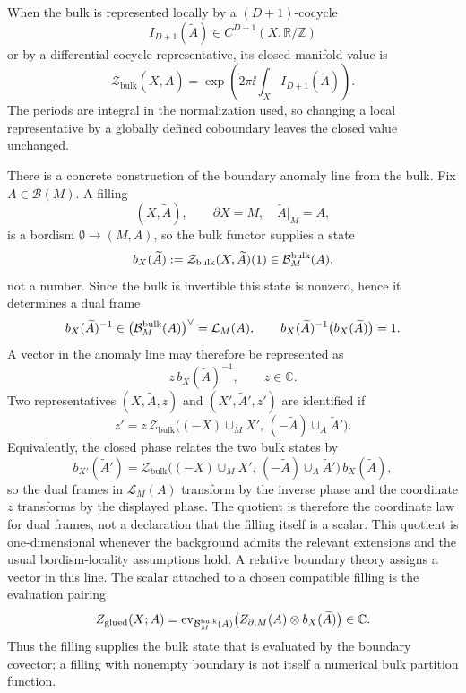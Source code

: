 When the bulk is represented locally by a \((D+1)\)-cocycle
\[
  I_{D+1}(\widetilde A)\in C^{D+1}(X,\mathbb R/\mathbb Z)
\]
or by a differential-cocycle representative, its closed-manifold value is
\[
  \mathcal Z_{\mathrm{bulk}}(X,\widetilde A)
  =
  \exp\left(2\pi\ii\int_X I_{D+1}(\widetilde A)\right).
\]
The periods are integral in the normalization used, so changing a local
representative by a globally defined coboundary leaves the closed value
unchanged.

There is a concrete construction of the boundary anomaly line from the bulk.
Fix \(A\in\mathcal B(M)\).  A filling
\[
  (X,\widetilde A),
  \qquad
  \partial X=M,\quad
  \widetilde A|_M=A,
\]
is a bordism \(\emptyset\to(M,A)\), so the bulk functor supplies a state
\[
  b_X(\widetilde A)
  :=
  \mathcal Z_{\rm bulk}(X,\widetilde A)(1)
  \in
  \mathcal B^{\rm bulk}_M(A),
\]
not a number.  Since the bulk is invertible this state is nonzero, hence it
determines a dual frame
\[
  b_X(\widetilde A)^{-1}
  \in
  \bigl(\mathcal B^{\rm bulk}_M(A)\bigr)^\vee
  =
  \mathcal L_M(A),
  \qquad
  b_X(\widetilde A)^{-1}\bigl(b_X(\widetilde A)\bigr)=1 .
\]
A vector in the anomaly line may therefore be represented as
\[
  z\,b_X(\widetilde A)^{-1},
  \qquad z\in\mathbb C.
\]
Two representatives
\((X,\widetilde A,z)\) and \((X',\widetilde A',z')\) are identified if
\[
  z'
  =
  z\,
  \mathcal Z_{\mathrm{bulk}}
  \bigl((-X)\cup_M X',\,(-\widetilde A)\cup_A\widetilde A'\bigr).
\]
Equivalently, the closed phase relates the two bulk states by
\[
  b_{X'}(\widetilde A')
  =
  \mathcal Z_{\mathrm{bulk}}
  \bigl((-X)\cup_M X',\,(-\widetilde A)\cup_A\widetilde A'\bigr)\,
  b_X(\widetilde A),
\]
so the dual frames in \(\mathcal L_M(A)\) transform by the inverse phase and
the coordinate \(z\) transforms by the displayed phase.  The quotient is
therefore the coordinate law for dual frames, not a declaration that the
filling itself is a scalar.
This quotient is one-dimensional whenever the background admits the relevant
extensions and the usual bordism-locality assumptions hold.  A relative
boundary theory assigns a vector in this line.  The scalar attached to a
chosen compatible filling is the evaluation pairing
\begin{equation}
  Z_{\rm glued}(X;A)
  =
  \operatorname{ev}_{\mathcal B^{\rm bulk}_M(A)}
  \bigl(
    Z_{\partial,M}(A)\otimes b_X(\widetilde A)
  \bigr)
  \in\mathbb C .
  \label{eq:inflow-boundary-bulk-evaluation}
\end{equation}
Thus the filling supplies the bulk state that is evaluated by the boundary
covector; a filling with nonempty boundary is not itself a numerical bulk
partition function.

